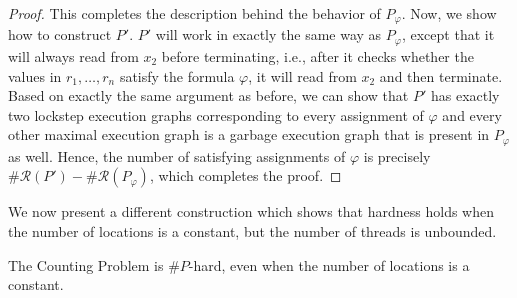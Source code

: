 \documentclass[acmsmall]{acmart}
\begin{document}
\begin{proof}
    This completes the description behind the behavior of $P_\varphi$. Now, we show how to construct $P'$. $P'$ will work in exactly the same way as $P_\varphi$, except that
    it will always read from $x_2$ before terminating, i.e., after it checks
    whether the values in $r_1,\dots,r_n$ satisfy the formula $\varphi$, it will
    read from $x_2$ and then terminate. Based on exactly the same argument as before,
    we can show that $P'$ has exactly two lockstep execution graphs corresponding to 
    every assignment of $\varphi$ and every other maximal execution graph
    is a garbage execution graph that is present in $P_\varphi$ as well.
    Hence, the number of satisfying assignments of $\varphi$ is precisely $\#\mathcal{R}(P') - \#\mathcal{R}(P_\varphi)$, which completes the proof.
\end{proof}

We now present a different construction which shows that hardness holds when the number of locations is a constant, but the number of threads is unbounded. 

\begin{theorem}
    The Counting Problem is $\#P$-hard, even when the number of locations is a constant.
\end{theorem}
\end{document}
